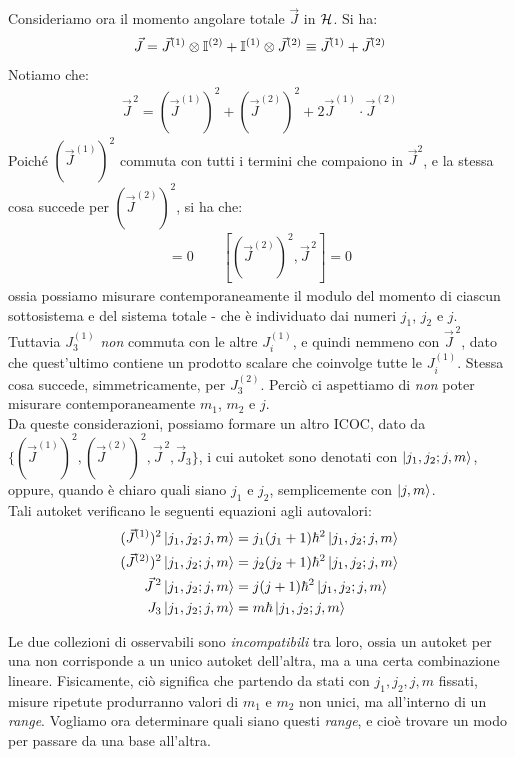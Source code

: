 \documentclass[../../FisicaTeorica.tex]{subfiles}
\begin{document}
Consideriamo ora il momento angolare totale $\vec{J}$ in $\mathcal{H}$. Si ha:
\begin{align*}
\vec{J} = \vec{J}^{(1)}\otimes \mathbb{I}^{(2)} + \mathbb{I}^{(1)} \otimes \vec{J}^{(2)} \equiv \vec{J}^{(1)}+\vec{J}^{(2)}
\end{align*}
Notiamo che:
\begin{align*}
\vec{J}^{\,2} = (\vec{J}^{(1)})^2 + (\vec{J}^{(2)})^2 + 2\vec{J}^{(1)}\cdot \vec{J}^{(2)}
\end{align*}
Poiché $(\vec{J}^{(1)})^2$ commuta con tutti i termini che compaiono in $\vec{J}^2$, e la stessa cosa succede per $(\vec{J}^{(2)})^2$, si ha che:
\begin{align*}
[(\vec{J}^{(1)})^2, \vec{J}^{\,2}]=0 \qquad [(\vec{J}^{(2)})^2, \vec{J}^{\,2}]=0
\end{align*}
ossia possiamo misurare contemporaneamente il modulo del momento di ciascun sottosistema e del sistema totale - che è individuato dai numeri $j_1$, $j_2$ e $j$. Tuttavia $J_3^{(1)}$ \textit{non} commuta con le altre $J_i^{(1)}$, e quindi nemmeno con $\vec{J}^{\,2}$, dato che quest'ultimo contiene un prodotto scalare che coinvolge tutte le $J^{(1)}_i$. Stessa cosa succede, simmetricamente, per $J_3^{(2)}$. Perciò ci aspettiamo di \textit{non} poter misurare contemporaneamente $m_1$, $m_2$ e $j$.\\
Da queste considerazioni, possiamo formare un altro ICOC, dato da $\{(\vec{J}^{(1)})^2, (\vec{J}^{(2)})^2, \vec{J}^{\,2}, \vec{J}_3\}$, i cui autoket sono denotati con $\Ket{j_1, j_2; j, m}$, oppure, quando è chiaro quali siano $j_1$ e $j_2$, semplicemente con $\Ket{j,m}$.\\
Tali autoket verificano le seguenti equazioni agli autovalori:
\begin{align*}
(\vec{J}^{(1)})^2 \Ket{j_1, j_2; j,m} &= j_1(j_1+1)\hbar^2 \Ket{j_1, j_2; j,m}\\
(\vec{J}^{(2)})^2 \Ket{j_1, j_2; j,m} &= j_2(j_2 + 1) \hbar^2 \Ket{j_1, j_2; j,m}\\
\vec{J}^{\,2} \Ket{j_1, j_2; j,m} &= j(j+1)\hbar^2 \Ket{j_1, j_2; j,m}\\
{J}_3 \Ket{j_1, j_2; j, m} &= m\hbar \Ket{j_1, j_2; j, m}
\end{align*}

Le due collezioni di osservabili sono \textit{incompatibili} tra loro, ossia un autoket per una non corrisponde a un unico autoket dell'altra, ma a una certa combinazione lineare. Fisicamente, ciò significa che partendo da stati con $j_1, j_2, j, m$ fissati, misure ripetute produrranno valori di $m_1$ e $m_2$ non unici, ma all'interno di un \textit{range}. Vogliamo ora determinare quali siano questi \textit{range}, e cioè trovare un modo per passare da una base all'altra.\\
\end{document}
